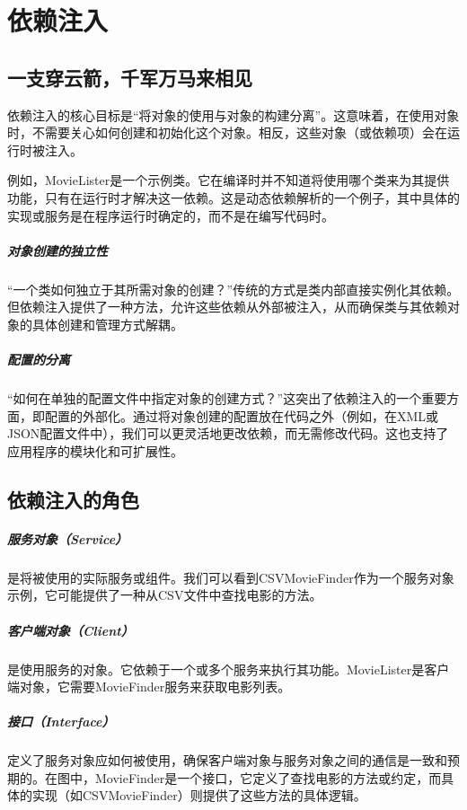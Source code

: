 \chapter{依赖注入}

\section{一支穿云箭，千军万马来相见}

依赖注入的核心目标是“将对象的使用与对象的构建分离”。这意味着，在使用对象时，不需要关心如何创建和初始化这个对象。相反，这些对象（或依赖项）会在运行时被注入。

例如，MovieLister是一个示例类。它在编译时并不知道将使用哪个类来为其提供功能，只有在运行时才解决这一依赖。这是动态依赖解析的一个例子，其中具体的实现或服务是在程序运行时确定的，而不是在编写代码时。

\paragraph{对象创建的独立性}
“一个类如何独立于其所需对象的创建？”传统的方式是类内部直接实例化其依赖。但依赖注入提供了一种方法，允许这些依赖从外部被注入，从而确保类与其依赖对象的具体创建和管理方式解耦。
\paragraph{配置的分离}
“如何在单独的配置文件中指定对象的创建方式？”这突出了依赖注入的一个重要方面，即配置的外部化。通过将对象创建的配置放在代码之外（例如，在XML或JSON配置文件中），我们可以更灵活地更改依赖，而无需修改代码。这也支持了应用程序的模块化和可扩展性。

\section{依赖注入的角色}
\paragraph{服务对象（Service）}是将被使用的实际服务或组件。我们可以看到CSVMovieFinder作为一个服务对象示例，它可能提供了一种从CSV文件中查找电影的方法。
\paragraph{客户端对象（Client）}是使用服务的对象。它依赖于一个或多个服务来执行其功能。MovieLister是客户端对象，它需要MovieFinder服务来获取电影列表。
\paragraph{接口（Interface）}定义了服务对象应如何被使用，确保客户端对象与服务对象之间的通信是一致和预期的。在图中，MovieFinder是一个接口，它定义了查找电影的方法或约定，而具体的实现（如CSVMovieFinder）则提供了这些方法的具体逻辑。
